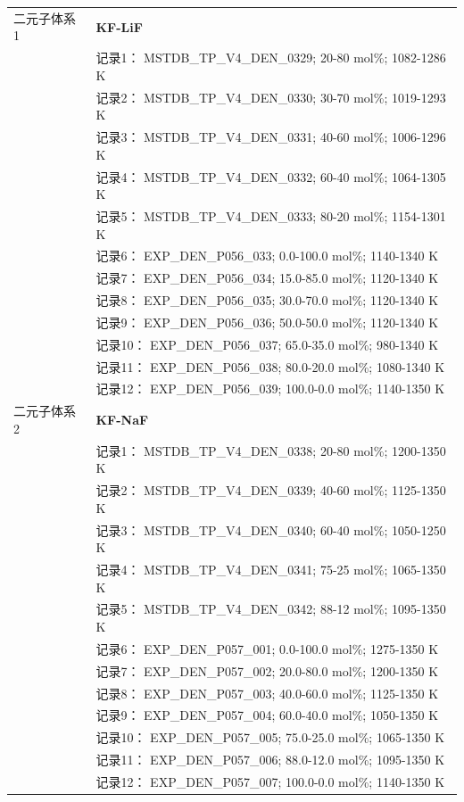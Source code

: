 \documentclass[12pt]{article}
\begin{document}
{\begin{longtable}[]{@{}
  >{\raggedright\arraybackslash}p{}
  >{\raggedright\arraybackslash}p{}@{}}
二元子体系 1  & \textbf{KF-LiF} \\
 & 记录1： MSTDB\_TP\_V4\_DEN\_0329; 20-80 mol\%; 1082-1286 K \\
 & 记录2： MSTDB\_TP\_V4\_DEN\_0330; 30-70 mol\%; 1019-1293 K \\
 & 记录3： MSTDB\_TP\_V4\_DEN\_0331; 40-60 mol\%; 1006-1296 K \\
 & 记录4： MSTDB\_TP\_V4\_DEN\_0332; 60-40 mol\%; 1064-1305 K \\
 & 记录5： MSTDB\_TP\_V4\_DEN\_0333; 80-20 mol\%; 1154-1301 K \\
 & 记录6： EXP\_DEN\_P056\_033; 0.0-100.0 mol\%; 1140-1340 K \\
 & 记录7： EXP\_DEN\_P056\_034; 15.0-85.0 mol\%; 1120-1340 K \\
 & 记录8： EXP\_DEN\_P056\_035; 30.0-70.0 mol\%; 1120-1340 K \\
 & 记录9： EXP\_DEN\_P056\_036; 50.0-50.0 mol\%; 1120-1340 K \\
 & 记录10： EXP\_DEN\_P056\_037; 65.0-35.0 mol\%; 980-1340 K \\
 & 记录11： EXP\_DEN\_P056\_038; 80.0-20.0 mol\%; 1080-1340 K \\
 & 记录12： EXP\_DEN\_P056\_039; 100.0-0.0 mol\%; 1140-1350 K  \\

二元子体系 2  & \textbf{KF-NaF} \\
 & 记录1： MSTDB\_TP\_V4\_DEN\_0338; 20-80 mol\%; 1200-1350 K \\
 & 记录2： MSTDB\_TP\_V4\_DEN\_0339; 40-60 mol\%; 1125-1350 K \\
 & 记录3： MSTDB\_TP\_V4\_DEN\_0340; 60-40 mol\%; 1050-1250 K \\
 & 记录4： MSTDB\_TP\_V4\_DEN\_0341; 75-25 mol\%; 1065-1350 K \\
 & 记录5： MSTDB\_TP\_V4\_DEN\_0342; 88-12 mol\%; 1095-1350 K \\
 & 记录6： EXP\_DEN\_P057\_001; 0.0-100.0 mol\%; 1275-1350 K \\
 & 记录7： EXP\_DEN\_P057\_002; 20.0-80.0 mol\%; 1200-1350 K \\
 & 记录8： EXP\_DEN\_P057\_003; 40.0-60.0 mol\%; 1125-1350 K \\
 & 记录9： EXP\_DEN\_P057\_004; 60.0-40.0 mol\%; 1050-1350 K \\
 & 记录10： EXP\_DEN\_P057\_005; 75.0-25.0 mol\%; 1065-1350 K \\
 & 记录11： EXP\_DEN\_P057\_006; 88.0-12.0 mol\%; 1095-1350 K \\
 & 记录12： EXP\_DEN\_P057\_007; 100.0-0.0 mol\%; 1140-1350 K  \\


\end{longtable}}
\end{document}
